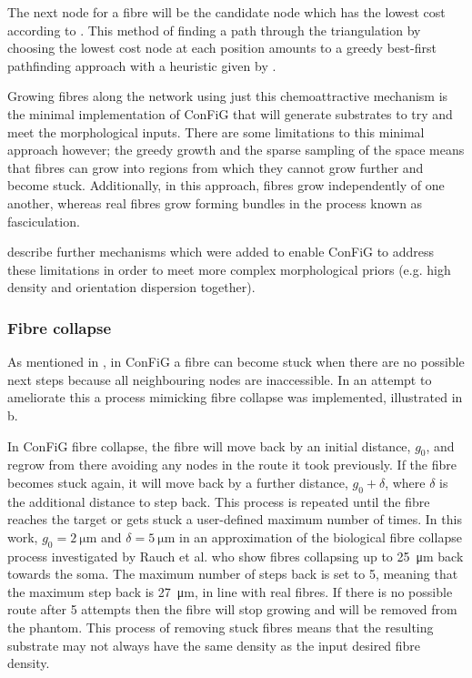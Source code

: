 The next node for a fibre will be the candidate node which has the lowest cost according to . This method of finding a path through the triangulation by choosing the lowest cost node at each position amounts to a greedy best-first pathfinding approach with a heuristic given by .

Growing fibres along the network using just this chemoattractive mechanism is the minimal implementation of \ac{ConFiG} that will generate substrates to try and meet the morphological inputs. There are some limitations to this minimal approach however; the greedy growth and the sparse sampling of the space means that fibres can grow into regions from which they cannot grow further and become stuck. Additionally, in this approach, fibres grow independently of one another, whereas real fibres grow forming bundles in the process known as fasciculation.

 describe further mechanisms which were added to enable \ac{ConFiG} to address these limitations in order to meet more complex morphological priors (e.g. high density and orientation dispersion together).

\subsubsection{Fibre collapse}
\label{sec:config_fibre_collapse}
As mentioned in , in \ac{ConFiG} a fibre can become stuck when there are no possible next steps because all neighbouring nodes are inaccessible. In an attempt to ameliorate this a process mimicking fibre collapse was implemented, illustrated in b.

In \ac{ConFiG} fibre collapse, the fibre will move back by an initial distance, $g_0$, and regrow from there avoiding any nodes in the route it took previously. If the fibre becomes stuck again, it will move back by a further distance, $g_0+ \delta$, where $\delta$ is the additional distance to step back. This process is repeated until the fibre reaches the target or gets stuck a user-defined maximum number of times. In this work, $g_0=\SI{2}{\micro\metre}$  and $\delta=\SI{5}{\micro\metre}$ in an approximation of the biological fibre collapse process investigated by Rauch et al. \cite{Rauch2013} who show fibres collapsing up to \SI{25}{\micro\metre} back towards the soma. The maximum number of steps back is set to 5, meaning that the maximum step back is \SI{27}{\micro\metre}, in line with real fibres. If there is no possible route after 5 attempts then the fibre will stop growing and will be removed from the phantom. This process of removing stuck fibres means that the resulting substrate may not always have the same density as the input desired fibre density.

